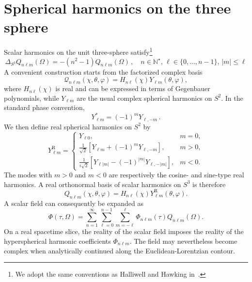 \documentclass[a4paper,11pt]{article}
\begin{document}
\section{Spherical harmonics on the three sphere}\label{harmonics}
Scalar harmonics on the unit three-sphere satisfy\footnote{We adopt the same conventions as Halliwell and Hawking in~\cite{Halliwell:1984eu}.}
\begin{equation}
    \Delta_{S^3}Q_{n\ell m}(\Omega)
    =
    -(n^2-1)Q_{n\ell m}(\Omega)\,, \quad n \in \mathbb{N}^\star,\,\ell \in\{0,...,n-1\},\, |m| \leq\ell
\end{equation}
A convenient construction starts from the factorized complex basis
\begin{equation}
    \mathcal{Q}_{n\ell m}(\chi,\theta,\varphi)
    =
    H_{n\ell}(\chi)Y_{\ell m}(\theta,\varphi),
\end{equation}
where $H_{n\ell}(\chi)$ is real and can be expressed in terms of
Gegenbauer polynomials, while $Y_{\ell m}$ are the usual complex
spherical harmonics on $S^2$. In the standard phase convention,
\begin{equation}
    Y_{\ell m}^{*}
    =
    (-1)^mY_{\ell,-m}\,.
\end{equation}
We then define real spherical harmonics on \(S^2\) by
\begin{equation}
Y_{\ell m}^{\mathrm{R}}
=
\begin{cases}
\displaystyle
Y_{\ell 0},
& m=0,
\\[0.25cm]
\displaystyle
\frac{1}{\sqrt{2}}
\left[
Y_{\ell m}+(-1)^mY_{\ell,-m}
\right],
& m>0,
\\[0.35cm]
\displaystyle
\frac{1}{i\sqrt{2}}
\left[
Y_{\ell |m|}
-
(-1)^{|m|}Y_{\ell,-|m|}
\right],
& m<0.
\end{cases}
\end{equation}
The modes with $m>0$ and $m<0$ are respectively the cosine- and
sine-type real harmonics. A real orthonormal basis of scalar harmonics on $S^3$ is therefore
\begin{equation}
    Q_{n\ell m}(\chi,\theta,\varphi)
    =
    H_{n\ell}(\chi)
    Y_{\ell m}^{\mathrm{R}}(\theta,\varphi).
\end{equation}
A scalar field can consequently be expanded as
\begin{equation}
    \Phi(\tau,\Omega)
    =
    \sum_{n=1}^{\infty}
    \sum_{\ell=0}^{n-1}
    \sum_{m=-\ell}^{\ell}
    \Phi_{n\ell m}(\tau)
    Q_{n\ell m}(\Omega).
\end{equation}
On a real spacetime slice, the reality of the scalar field imposes the reality of the hyperspherical harmonic coefficients $\Phi_{n \ell m}$. The field may nevertheless become complex when analytically continued along the Euclidean-Lorentzian contour.
\end{document}
